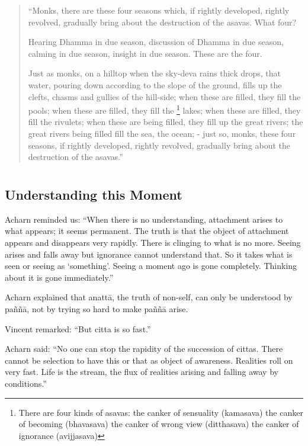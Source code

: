 \begin{quote}

``Monks, there are these four seasons which, if rightly developed, rightly revolved, gradually bring about the destruction of 
the asavas. What four? 

Hearing Dhamma in due season, discussion of Dhamma in due 
season, calming in due season, insight in due season. These are 
the four. 

Just as monks, on a hilltop when the sky-deva rains thick drops, 
that water, pouring down according to the slope of the ground, 
fills up the clefts, chasms and gullies of the hill-side; when these 
are filled, they fill the pools; when these are filled, they fill the 
\footnote{There are four kinds of asavas: 
the canker of sensuality (kamasava) 
the canker of becoming (bhavasava) 
the canker of wrong view (ditthasava) 
the canker of ignorance (avijjasava) }
lakes; when these are filled, they fill the rivulets; when these are 
being filled, they fill up the great rivers; the great rivers being 
filled fill the sea, the ocean; - just so, monks, these four seasons, 
if rightly developed, rightly revolved, gradually bring about the 
destruction of the asavas.'' 
\end{quote}

\chapter[Understanding this Moment]{} 
\section*{Understanding this Moment}

Acharn reminded us: ``When there is no understanding, attachment arises to 
what appears; it seems permanent. The truth is that the object of attachment appears and disappears very rapidly. There is clinging to what is no more. Seeing 
arises and falls away but ignorance cannot understand that. So it takes what is 
seen or seeing as `something'. Seeing a moment ago is gone completely. Thinking about it is gone immediately.'' 

Acharn explained that anattā, the truth of non-self, can only be understood by 
paññā, not by trying so hard to make paññā arise. 

Vincent remarked: ``But citta is so fast.'' 

Acharn said: ``No one can stop the rapidity of the succession of cittas. There 
cannot be selection to have this or that as object of awareness. Realities roll on 
very fast. Life is the stream, the flux of realities arising and falling away by 
conditions.'' 

